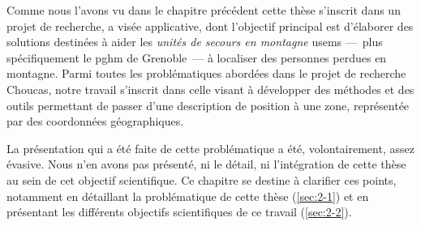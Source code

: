 Comme nous l'avons vu dans le chapitre précédent cette thèse s'inscrit
dans un projet de recherche, a visée applicative, dont l'objectif
principal est d’élaborer des solutions destinées à aider les
\emph{unités de secours en montagne} \acp{usem} ---~plus
spécifiquement le \ac{pghm} de Grenoble~--- à localiser des personnes
perdues en montagne. Parmi toutes les problématiques abordées dans le
projet de recherche Choucas, notre travail s'inscrit dans celle visant
à développer des méthodes et des outils permettant de passer d'une
description de position à une zone, représentée par des coordonnées
géographiques.

La présentation qui a été faite de cette problématique a été,
volontairement, assez évasive. Nous n'en avons pas présenté, ni le
détail, ni l'intégration de cette thèse au sein de cet objectif
scientifique. Ce chapitre se destine à clarifier ces points, notamment
en détaillant la problématique de cette thèse (\autoref{sec:2-1}) et en
présentant les différents objectifs scientifiques de ce travail
(\autoref{sec:2-2}).


